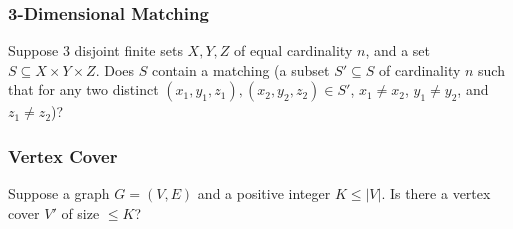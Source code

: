\subsubsection{3-Dimensional Matching} Suppose $3$ disjoint finite sets $X,Y,Z$ of
equal cardinality $n$,  and a set $S\subseteq X\times Y\times Z $. Does $S$
contain a matching (a subset $S'\subseteq S$ of cardinality $n$ such that for
any two distinct $\left( x_1,y_1,z_1 \right) , \left( x_2,y_2,z_2 \right) \in
S'$, $x_1\neq x_2$, $y_1\neq y_2$, and $z_1\neq z_2$)?\\

\subsubsection{Vertex Cover} Suppose a graph $G=\left( V,E \right) $ and a
positive integer $K\le \left| V \right| $. Is there a vertex cover $V'$ of size
$\le K$?\\

